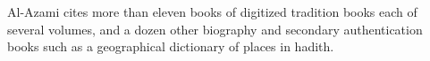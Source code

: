 \documentclass{llncs}
\newcommand{\noArRL}[1]{\arabfalse\RL{#1}\arabtrue}
\begin{document}
%
Al-Azami\cite{Al-Azami-91} cites more than eleven books
of digitized tradition books each of several volumes, and a dozen
other biography and secondary authentication books such
as a geographical dictionary of places in hadith. 

\end{document}
